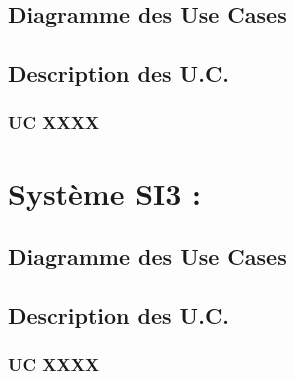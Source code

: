 \documentclass[a4paper, 11pt]{report}
\begin{document}
\subsection{Diagramme des Use Cases}
\subsection{Description des U.C.}
\subsubsection{UC XXXX}
\section{Système SI3 : }
\subsection{Diagramme des Use Cases}
\subsection{Description des U.C.}
\subsubsection{UC XXXX}
\end{document}
